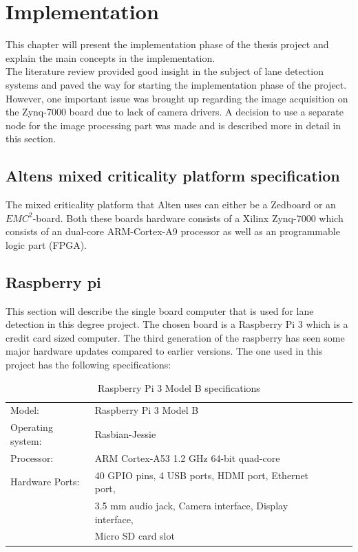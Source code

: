 \chapter{Implementation}
This chapter will present the implementation phase of the thesis project and explain the main concepts in the implementation.\\

The literature review provided good insight in the subject of lane detection systems and paved the way for starting the implementation phase of the project. However, one important issue was brought up  regarding the image acquisition on the Zynq-7000 board due to lack of camera drivers. A decision to use a separate node for the image processing part was made and is described more in detail in this section.
\section{Altens mixed criticality platform specification}
The mixed criticality platform that Alten uses can either be a Zedboard or an $EMC^2$-board. Both these boards hardware consists of a Xilinx Zynq-7000 which consists of an dual-core ARM-Cortex-A9 processor as well as an programmable logic part (FPGA). 
\section{Raspberry pi}
This section will describe the single board computer that is used for lane detection in this degree project. The chosen board is a Raspberry Pi 3 which is a credit card sized computer. The third generation of the raspberry has seen some major hardware updates compared to earlier versions. The one used in this project has the following specifications:


\begin{table}[H]
\centering
\caption{Raspberry Pi 3 Model B specifications}
\label{my-label}
\begin{tabular}{lllll}
 Model:	&Raspberry Pi 3 Model B  \\
 Operating system:	&Rasbian-Jessie  \\
 Processor:	&ARM Cortex-A53 1.2 GHz 64-bit quad-core  \\
 Hardware Ports:	&40 GPIO pins, 4 USB ports, HDMI port, Ethernet port,\\  &3.5 mm audio jack, Camera interface, Display interface,\\  &Micro SD card slot
\end{tabular}
\end{table}


